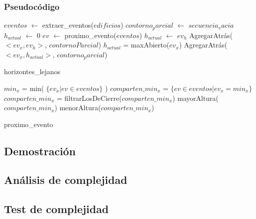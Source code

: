 \subsubsection{Pseudoc\'odigo}
\begin{algorithm}[H]
\begin{algorithmic}
\STATE $eventos$ $\gets$ extraer\_eventos($edificios$)
\STATE $contorno_parcial$ $\gets$ $secuencia_vacia$
\STATE $h_{actual}$ $\gets$ 0
	\STATE $ev$ $\gets$ proximo\_evento($eventos$)
			\STATE $h_{actual}$ $\gets$ $ev_h$
			\STATE AgregarAtrás($<ev_x, ev_h>$, $contornoParcial$)
		\ENDIF
	\ELSE
			\STATE $h_{actual}$ = maxAbierto($ev_x$)
			\STATE AgregarAtrás($<ev_x, h_{actual}>$, $contorno_parcial$)  
		\ENDIF
	\ENDIF
\ENDWHILE
\caption{horizontes\_lejanos}
\end{algorithmic}
\end{algorithm}

\begin{algorithm}[H]
\begin{algorithmic}
	\STATE $min_x$ = min( $\{ ev_x | ev \in eventos\}$ )
	\STATE $comparten\_min_x$ = $\{ ev \in eventos | ev_x = min_x \}$
		\STATE $comparten\_min_x$ = filtrarLosDeCierre($comparten\_min_x$)
		\RETURN mayorAltura($comparten\_min_x$)
	\ELSE
		\RETURN menorAltura($comparten\_min_x$)
	\ENDIF
\caption{proximo\_evento}
\end{algorithmic}
\end{algorithm}

\subsection{Demostraci\'on}


\subsection{An\'alisis de complejidad}

\subsection{Test de complejidad}

